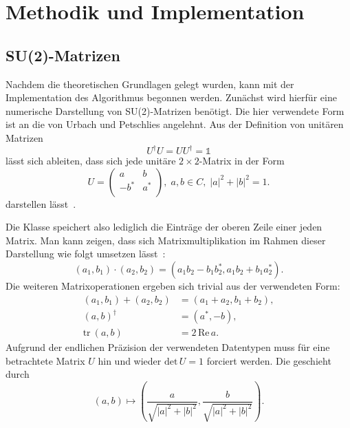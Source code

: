 
\chapter{Methodik und Implementation}
\label{sec:implementation}

\section{SU(2)-Matrizen} \label{sec:su2matrix}
Nachdem die theoretischen Grundlagen gelegt wurden, kann mit der Implementation
des Algorithmus begonnen werden. Zunächst wird hierfür eine numerische Darstellung
von SU(2)-Matrizen benötigt. Die hier verwendete Form ist an die von Urbach und
Petschlies \cite{urbachCPscript} angelehnt. Aus der Definition von unitären Matrizen
\[
    U^\dag U = U U^\dag = \mathds{1}
\]
lässt sich ableiten, dass sich jede unitäre $2 \times 2$-Matrix in der Form
\[
U =
\begin{pmatrix}
    a    & b   \\
    -b^* & a^* \\
\end{pmatrix},
\; a, b \in {C}, \; |a|^2 + |b|^2 = 1.
\]
darstellen lässt~\cite{urbachCPscript}.

Die Klasse speichert also lediglich die Einträge der oberen Zeile einer jeden Matrix.
Man kann zeigen, dass sich Matrixmultiplikation im Rahmen dieser Darstellung wie
folgt umsetzen lässt~\cite{urbachCPscript}:
\[
    (a_1, b_1) \cdot (a_2, b_2) = (a_1 b_2 - b_1 b_2^*, a_1 b_2 + b_1 a_2^*).
\]
Die weiteren Matrixoperationen ergeben sich trivial aus der verwendeten Form:
\begin{align*}
    (a_1, b_1) + (a_2, b_2) &= (a_1 + a_2, b_1 + b_2), \\
    (a, b)^\dag &= (a^*, -b), \\
    \text{tr}~(a, b) &= 2 \, \text{Re} \, a.
\end{align*}
Aufgrund der endlichen Präzision der verwendeten Datentypen muss für eine betrachtete
Matrix $U$ hin und wieder $\text{det} \, U = 1$ forciert werden. Die geschieht durch
\cite{urbachCPscript}
\[
    (a, b) \mapsto \left(\frac{a}{\sqrt{|a|^2 + |b|^2}},
    \frac{b}{\sqrt{|a|^2 + |b|^2}}\right).
\]

